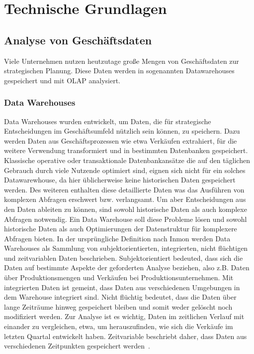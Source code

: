 \chapter{Technische Grundlagen}
\section{Analyse von Geschäftsdaten}
Viele Unternehmen nutzen heutzutage große Mengen von Geschäftsdaten zur strategischen Planung. Diese Daten werden in sogenannten Datawarehouses gespeichert und mit \acf{OLAP} analysiert.
\subsection{Data Warehouses}
Data Warehouses wurden entwickelt, um Daten, die für strategische Entscheidungen im Geschäftsumfeld nützlich sein können, zu speichern.
Dazu werden Daten aus Geschäftsprozessen wie etwa Verkäufen extrahiert, für die weitere Verwendung transformiert und in bestimmten Datenbanken gespeichert.
Klassische  operative oder transaktionale Datenbankansätze die auf den täglichen Gebrauch durch viele Nutzende optimiert sind, eignen sich nicht für ein solches Datawarewhouse, da hier üblicherweise keine historischen Daten gespeichert werden.
Des weiteren enthalten diese detaillierte Daten was das Ausführen von komplexen Abfragen erschwert bzw. verlangsamt.
Um aber Entscheidungen aus den Daten ableiten zu können, sind sowohl historische Daten als auch komplexe Abfragen notwendig.
Ein Data Warehouse soll diese Probleme lösen und sowohl historische Daten als auch Optimierungen der Datenstruktur für komplexere Abfragen bieten.
In der ursprüngliche Definition nach Inmon werden Data Warehouses als Sammlung von subjektorientierten, integrierten, nicht flüchtigen und zeitvariablen Daten beschrieben.
Subjektorientiert bedeuted, dass sich die Daten auf bestimmte Aspekte der geforderten Analyse beziehen, also z.B. Daten über Produktionsmengen und Verkäufen bei Produktionsunternehmen.
Mit integrierten Daten ist gemeint, dass Daten aus verschiedenen Umgebungen in dem Warehouse integriert sind.
Nicht flüchtig bedeutet, dass die Daten über lange Zeiträume hinweg gespeichert bleiben und somit weder gelöscht noch modifiziert werden.
Zur Analyse ist es wichtig, Daten im zeitlichen Verlauf mit einander zu vergleichen, etwa, um herauszufinden, wie sich die Verkäufe im letzten Quartal entwickelt haben. Zeitvariable beschriebt daher, dass Daten aus verschiedenen Zeitpunkten gespeichert werden~\cite[s. 3-4]{vaisman_data_2022}.

